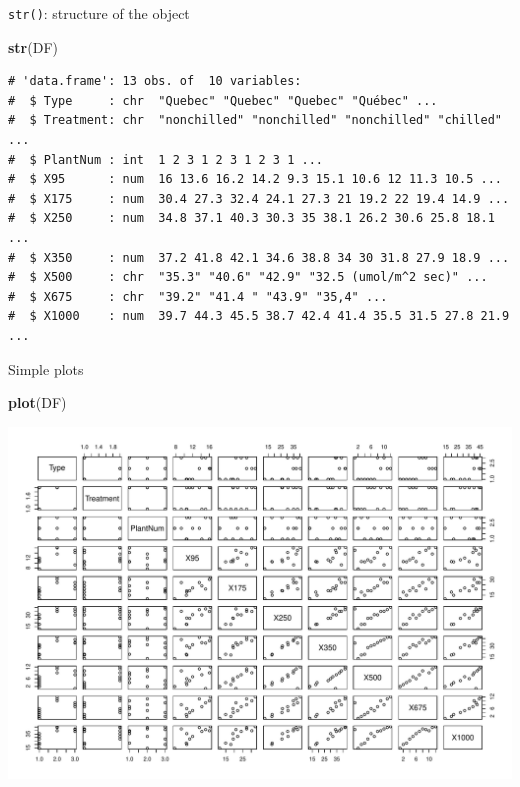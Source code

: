 \documentclass[
  11pt,
  ignorenonframetext,
]{beamer}
\newcommand{\VERB}{\Verb[commandchars=\\\{\}]}
\newenvironment{Shaded}{\begin{snugshade}}{\end{snugshade}}
\newcommand{\FunctionTok}[1]{\textcolor[rgb]{0.13,0.29,0.53}{\textbf{#1}}}
\newcommand{\NormalTok}[1]{#1}
\begin{document}
\begin{frame}[fragile]{\texttt{str()}: structure of the object}
\protect\hypertarget{str-structure-of-the-object}{}
\begin{Shaded}
\begin{Highlighting}[]
\FunctionTok{str}\NormalTok{(DF)}
\end{Highlighting}
\end{Shaded}

\begin{verbatim}
# 'data.frame': 13 obs. of  10 variables:
#  $ Type     : chr  "Quebec" "Quebec" "Quebec" "Québec" ...
#  $ Treatment: chr  "nonchilled" "nonchilled" "nonchilled" "chilled" ...
#  $ PlantNum : int  1 2 3 1 2 3 1 2 3 1 ...
#  $ X95      : num  16 13.6 16.2 14.2 9.3 15.1 10.6 12 11.3 10.5 ...
#  $ X175     : num  30.4 27.3 32.4 24.1 27.3 21 19.2 22 19.4 14.9 ...
#  $ X250     : num  34.8 37.1 40.3 30.3 35 38.1 26.2 30.6 25.8 18.1 ...
#  $ X350     : num  37.2 41.8 42.1 34.6 38.8 34 30 31.8 27.9 18.9 ...
#  $ X500     : chr  "35.3" "40.6" "42.9" "32.5 (umol/m^2 sec)" ...
#  $ X675     : chr  "39.2" "41.4 " "43.9" "35,4" ...
#  $ X1000    : num  39.7 44.3 45.5 38.7 42.4 41.4 35.5 31.5 27.8 21.9 ...
\end{verbatim}

\end{frame}

\begin{frame}{Simple plots}
\protect\hypertarget{simple-plots}{}
\begin{Shaded}
\begin{Highlighting}[]
\FunctionTok{plot}\NormalTok{(DF)}
\end{Highlighting}
\end{Shaded}

\includegraphics{R_data_scripting_files/figure-beamer/plot_basic-1.pdf}
\end{frame}
\end{document}
